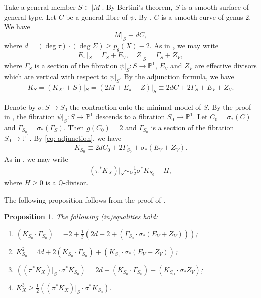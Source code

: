 \documentclass[a4paper,11pt]{amsart}
\newcommand{\PP}{\ensuremath{\mathbb{P}}}
\newcommand{\QQ}{\ensuremath{\mathbb{Q}}}
\newtheorem{prop}[thm]{Proposition}
\theoremstyle{definition}
\theoremstyle{remark}
\numberwithin{equation}{section}
\begin{document}
Take a general member $S\in |M|$. By Bertini's theorem, $S$ is a smooth surface of general type.  Let $C$ be a general fibre of $\psi$. By \cite[Lemma 3.1]{HZ}, $C$ is a smooth curve of genus $2$. We have
$$
M|_S\equiv dC,
$$
where $d = (\deg\tau) \cdot (\deg\Sigma) \ge p_g(X) - 2$. As in \cite[(3.3)]{HZ}, we may write
\begin{equation} \label{eq: E|_SZ|_S}
	E_\pi|_S = \Gamma_S + E_V, \quad Z|_S = \Gamma_S + Z_V,
\end{equation}
where $\Gamma_S$ is a section of the fibration $\psi|_S\colon S\to \PP^1$, $E_V$ and $Z_V$ are effective divisors which are vertical with respect to $\psi|_S$. By the adjunction formula, we have
\begin{align}\label{eq: adjunction}
	K_S = (K_{X'} + S)|_S = (2M + E_\pi + Z)|_S \equiv 2dC + 2\Gamma_S + E_V + Z_V.
\end{align}

Denote by $\sigma\colon S \to S_0$ the contraction onto the minimal model of $S$. By the proof in \cite[Proposition 3.5]{HZ}, the fibration $\psi|_S \colon S\to \PP^1$ descends to a fibration $S_0\to \PP^1$. Let $C_0=\sigma_*(C)$ and $\Gamma_{S_0}=\sigma_*(\Gamma_S)$. Then $g(C_0) = 2$ and $\Gamma_{S_0}$ is a section of the fibration $S_0 \to \PP^1$. By \eqref{eq: adjunction}, we have
\begin{align}\label{eq: K_S0}
	K_{S_0}\equiv 2dC_0+2\Gamma_{S_0}+\sigma_*(E_V+Z_V).
\end{align}
As in \cite[(3.5)]{HZ}, we may write
\begin{align}\label{eq: extension}
	(\pi^*K_X)|_S \sim_{\mathbb{Q}} \frac{1}{2}\sigma^*K_{S_0} + H,
\end{align}
where $H \ge 0$ is a $\QQ$-divisor. 

The following proposition follows from the proof of \cite[Proposition 3.5]{HZ}.
\begin{prop}\label{prop: estimate on S}
	The following (in)equalities hold:
	\begin{enumerate}
		\item[(1)]  $(K_{S_0} \cdot \Gamma_{S_0}) = -2 + \frac{1}{3}\left(2d + 2 + \left(\Gamma_{S_0} \cdot \sigma_*(E_V + Z_V) \right) \right)$;
		
		\item[(2)] $K_{S_0}^2 = 4d + 2(K_{S_0} \cdot \Gamma_{S_0}) + \left(K_{S_0} \cdot \sigma_*(E_V+Z_V)\right)$;
		\item[(3)] $\left(\left(\pi^*K_X\right)|_S \cdot \sigma^*K_{S_0}\right) = 2d + (K_{S_0} \cdot \Gamma_{S_0}) + (K_{S_0} \cdot \sigma_*Z_V)$;
		\item[(4)] $K_X^3 \ge \frac{1}{2} \left(\left(\pi^*K_X\right)|_S \cdot \sigma^*K_{S_0}\right)$. 
	\end{enumerate}
\end{prop}
\end{document}
